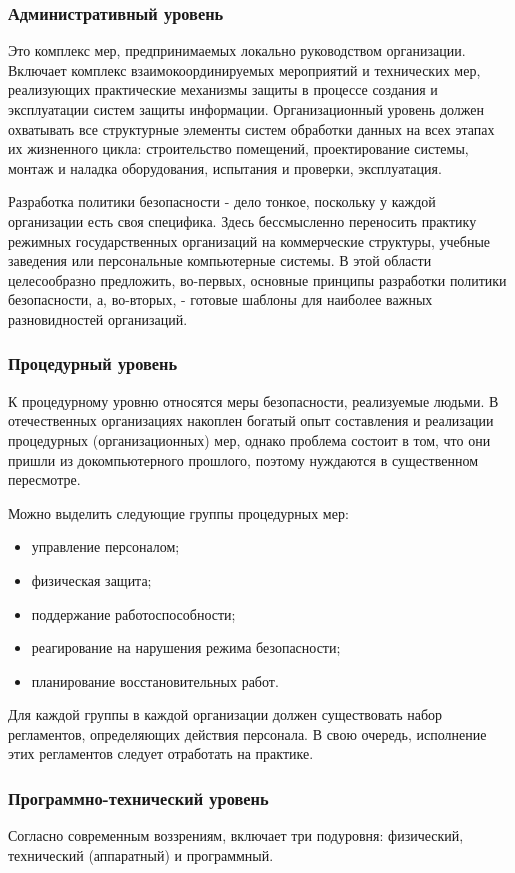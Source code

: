 \subsubsection{Административный уровень}
Это комплекс мер, предпринимаемых локально руководством организации. Включает
комплекс взаимокоординируемых мероприятий и технических мер, реализующих
практические механизмы защиты в процессе создания и эксплуатации систем
защиты информации. Организационный уровень должен охватывать все структурные
элементы систем обработки данных на всех этапах их жизненного цикла:
строительство помещений, проектирование системы, монтаж и наладка
оборудования, испытания и проверки, эксплуатация.

Разработка политики безопасности - дело тонкое, поскольку у каждой
организации есть своя специфика. Здесь бессмысленно переносить практику
режимных государственных организаций на коммерческие структуры, учебные
заведения или персональные компьютерные системы. В этой области целесообразно
предложить, во-первых, основные принципы разработки политики безопасности, а,
во-вторых, - готовые шаблоны для наиболее важных разновидностей организаций.
\subsubsection{Процедурный уровень}
К процедурному уровню относятся меры безопасности, реализуемые людьми. В
отечественных организациях накоплен богатый опыт составления и реализации
процедурных (организационных) мер, однако проблема состоит в том, что они
пришли из докомпьютерного прошлого, поэтому нуждаются в существенном
пересмотре.

\noindent Можно выделить следующие группы процедурных мер:
\begin{itemize}
 \item управление персоналом;%
 \item физическая защита;%
 \item поддержание работоспособности;%
 \item реагирование на нарушения режима безопасности;%
 \item планирование восстановительных работ.%
\end{itemize}
Для каждой группы в каждой организации должен существовать набор регламентов,
определяющих действия персонала. В свою очередь, исполнение этих регламентов
следует отработать на практике.
\subsubsection{Программно-технический уровень}
Согласно современным воззрениям, включает три подуровня: физический,
технический (аппаратный) и программный.


